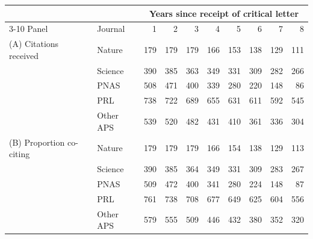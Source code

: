 \begin{tabular}{llrrrrrrrr}
\toprule
 & & \multicolumn{8}{c}{Years since receipt of critical letter} \\
\cmidrule(lr){3-10}
Panel & Journal & 1 & 2 & 3 & 4 & 5 & 6 & 7 & 8 \\
\midrule
(A) Citations received & Nature & 179 & 179 & 179 & 166 & 153 & 138 & 129 & 111 \\
 & Science & 390 & 385 & 363 & 349 & 331 & 309 & 282 & 266 \\
 & PNAS & 508 & 471 & 400 & 339 & 280 & 220 & 148 & 86 \\
 & PRL & 738 & 722 & 689 & 655 & 631 & 611 & 592 & 545 \\
 & Other APS & 539 & 520 & 482 & 431 & 410 & 361 & 336 & 304 \\
\midrule
(B) Proportion co-citing & Nature & 179 & 179 & 179 & 166 & 154 & 138 & 129 & 113 \\
 & Science & 390 & 385 & 364 & 349 & 331 & 309 & 283 & 267 \\
 & PNAS & 509 & 472 & 400 & 341 & 280 & 224 & 148 & 87 \\
 & PRL & 761 & 738 & 708 & 677 & 649 & 625 & 604 & 556 \\
 & Other APS & 579 & 555 & 509 & 446 & 432 & 380 & 352 & 320 \\
\bottomrule
\end{tabular}
